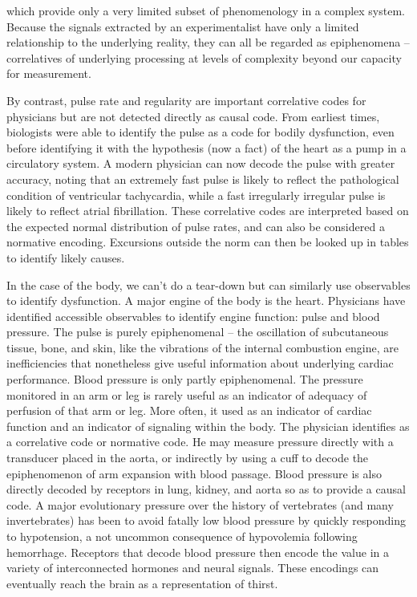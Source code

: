 \documentclass[12pt]{article}
\begin{document}
which provide only a very limited subset of
phenomenology in a complex system. Because the signals extracted by an experimentalist have only a limited relationship to the underlying reality, they can all be regarded
as epiphenomena -- correlatives of underlying processing at levels of complexity beyond our capacity for measurement.

By contrast, pulse rate and regularity are important correlative codes for physicians but are not detected directly as causal code. From earliest times, biologists were able
to identify the pulse as a code for bodily dysfunction, even before identifying it with the hypothesis (now a fact) of the heart as a pump in a circulatory system. A modern
physician can now decode the pulse with greater accuracy, noting that an extremely fast pulse is likely to reflect the pathological condition of ventricular tachycardia, while
a fast irregularly irregular pulse is likely to reflect atrial fibrillation. These correlative codes are interpreted based on the expected normal distribution of pulse rates,
and can also be considered a normative encoding. Excursions outside the norm can then be looked up in tables to identify likely causes.

In the case of the body, we can't do a tear-down but can similarly use observables to identify dysfunction. A major engine of the body is the heart. Physicians have identified
accessible observables to identify engine function: pulse and blood pressure. The pulse is purely epiphenomenal -- the oscillation of subcutaneous tissue, bone, and skin, like
the vibrations of the internal combustion engine, are inefficiencies that nonetheless give useful information about underlying cardiac performance. 
Blood pressure is only partly epiphenomenal. The pressure monitored in an arm or leg is rarely useful as an indicator of adequacy of perfusion of that arm or leg. More often,
it used as an indicator of cardiac function and an indicator of signaling within the body. The physician identifies as a correlative code or normative code. He may measure pressure
directly with a transducer placed in the aorta, or indirectly by using a cuff to decode the epiphenomenon of arm expansion with blood passage. Blood pressure is also directly
decoded by receptors in lung, kidney, and aorta so as to provide a causal code. A major evolutionary pressure over the history of vertebrates (and many invertebrates) has been
to avoid fatally low blood pressure by quickly responding to hypotension, a not uncommon consequence of hypovolemia following hemorrhage. Receptors that decode blood pressure
then encode the value in a variety of interconnected hormones and neural signals. These encodings can eventually reach the brain as a representation of thirst.
\end{document}
